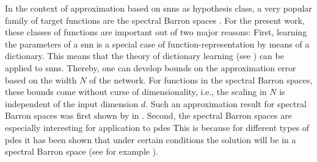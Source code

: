 \documentclass[a4paper]{article}
\numberwithin{equation}{section}
\theoremstyle{remark}
\begin{document}
In the context of approximation based on \glspl{snn} as hypothesis class,
a very popular family of target functions are the spectral Barron spaces
\cite{
Barron93UniversalApproximationBounds,
Breiman93HingingHyperplanesRegression,
Caragea23NeuralNetworkApproximation,
Chen23RegularityTheoryStatic,
E22BarronSpaceFlowInduced,
Klusowski18ApproximationCombinationsReLU,
Ma22UniformApproximationRates,
Siegel20ApproximationRatesNeural,
Voigtlaender22SamplingNumbersFourierAnalytic,
}.
For the present work,
these classes of functions are important out of two major reasons:
First, 
learning the parameters of a \gls{snn}
is a special case of function-representation
by means of a dictionary.
This means that the theory of dictionary learning (see 
\cite{
DeVore98NonlinearApproximation,
Kurkova01BoundsRatesVariableBasis,
Barron08ApproximationLearningGreedy,
}) can be applied to \glspl{snn}.
Thereby, one can develop bounds on the approximation error
based on the width $N$ of the network.
For functions in the spectral Barron spaces,
these bounds come without curse of dimensionality, i.e., the scaling in $N$ is independent of the input dimension $d$.
Such an approximation result for spectral Barron spaces was first shown by \citeauthor{Barron93UniversalApproximationBounds} in
\cite{
Barron93UniversalApproximationBounds,
}.
Second,
the spectral Barron spaces are especially interesting for application to \glspl{pde}
This is because for different types of \glspl{pde} it has been shown that under certain conditions the solution will be in a spectral Barron space 
(see for example \cite{Gonon23RandomFeatureNeural,Chen23RegularityTheoryStatic}).
\end{document}
